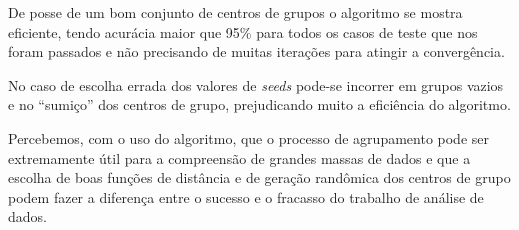 \documentclass[12pt, a4paper]{article}
\begin{document}
De posse de um bom conjunto de centros de grupos o algoritmo se mostra eficiente, tendo acurácia maior que 95\% para todos os casos de teste que nos foram passados e não precisando de muitas iterações para atingir a convergência.

No caso de escolha errada dos valores de \textit{seeds} pode-se incorrer em grupos vazios e no ``sumiço'' dos centros de grupo, prejudicando muito a eficiência do algoritmo.

Percebemos, com o uso do algoritmo, que o processo de agrupamento pode ser extremamente útil para a compreensão de grandes massas de dados e que a escolha de boas funções de distância e de geração randômica dos centros de grupo podem fazer a diferença entre o sucesso e o fracasso do trabalho de análise de dados.

\newpage

\end{document}
